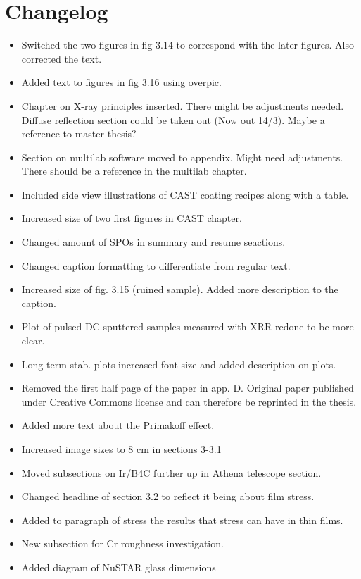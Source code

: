 \chapter{Changelog}

\begin{itemize}
  \item Switched the two figures in fig 3.14 to correspond with the later figures. Also corrected the text.
  \item Added text to figures in fig 3.16 using overpic.
  \item Chapter on X-ray principles inserted. There might be adjustments needed. Diffuse reflection section could be taken out (Now out 14/3). Maybe a reference to master thesis?
  \item Section on multilab software moved to appendix. Might need adjustments. There should be a reference in the multilab chapter.
  \item Included side view illustrations of CAST coating recipes along with a table.
  \item Increased size of two first figures in CAST chapter.
  \item Changed amount of SPOs in summary and resume seactions.
  \item Changed caption formatting to differentiate from regular text.
  \item Increased size of fig. 3.15 (ruined sample). Added more description to the caption.
  \item Plot of pulsed-DC sputtered samples measured with XRR redone to be more clear.
  \item Long term stab. plots increased font size and added description on plots.
  \item Removed the first half page of the paper in app. D. Original paper published under Creative Commons license and can therefore be reprinted in the thesis.
  \item Added more text about the Primakoff effect.
  \item Increased image sizes to 8 cm in sections 3-3.1
  \item Moved subsections on Ir/B4C further up in Athena telescope section.
  \item Changed headline of section 3.2 to reflect it being about film stress.
  \item Added to paragraph of stress the results that stress can have in thin films.
  \item New subsection for Cr roughness investigation.
  \item Added diagram of NuSTAR glass dimensions

\end{itemize}
